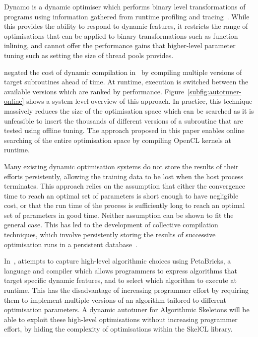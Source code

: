 Dynamo is a dynamic optimiser which performs binary level
transformations of programs using information gathered from runtime
profiling and tracing~\cite{Bala2000}. While this provides the ability
to respond to dynamic features, it restricts the range of
optimisations that can be applied to binary transformations such as
function inlining, and cannot offer the performance gains that
higher-level parameter tuning such as setting the size of thread pools
provides.

\citeauthor{Fursin2005} negated the cost of dynamic compilation
in~\cite{Fursin2005} by compiling multiple versions of target
subroutines ahead of time. At runtime, execution is switched between
the available versions which are ranked by
performance. Figure~\ref{subfig:autotuner-online} shows a system-level
overview of this approach. In practice, this technique massively
reduces the size of the optimisation space which can be searched as it
is unfeasible to insert the thousands of different versions of a
subroutine that are tested using offline tuning. The approach proposed
in this paper enables online searching of the entire optimisation
space by compiling OpenCL kernels at runtime.

Many existing dynamic optimisation systems do not store the results of
their efforts persistently, allowing the training data to be lost when
the host process terminates. This approach relies on the assumption
that either the convergence time to reach an optimal set of parameters
is short enough to have negligible cost, or that the run time of the
process is sufficiently long to reach an optimal set of parameters in
good time. Neither assumption can be shown to fit the general
case. This has led to the development of collective compilation
techniques, which involve persistently storing the results of
successive optimisation runs in a persistent
database~\cite{Fursin2010}.

In~\cite{Ansel2009a}, \citeauthor{Ansel2009a} attempts to capture
high-level algorithmic choices using PetaBricks, a language and
compiler which allows programmers to express algorithms that target
specific dynamic features, and to select which algorithm to execute at
runtime. This has the disadvantage of increasing programmer effort by
requiring them to implement multiple versions of an algorithm tailored
to different optimisation parameters. A dynamic autotuner for
Algorithmic Skeletons will be able to exploit these high-level
optimisations without increasing programmer effort, by hiding the
complexity of optimisations within the SkelCL library.

